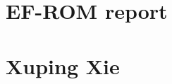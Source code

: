 \documentclass[paper=a4, fontsize=11pt]{scrartcl} %
\numberwithin{equation}{section} %
\numberwithin{figure}{section} %
\numberwithin{table}{section} %
\begin{document}


\section*{EF-ROM report}
\section*{Xuping Xie}
\end{document}
